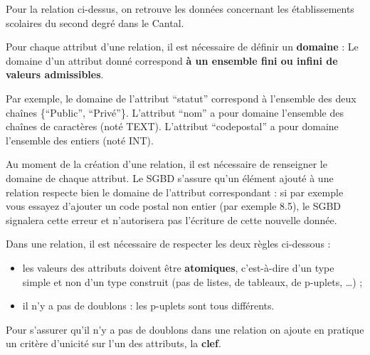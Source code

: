 \documentclass[
  letterpaper,
  DIV=11,
  numbers=noendperiod]{scrartcl}
\providecommand{\tightlist}{%
  \setlength{\itemsep}{0pt}\setlength{\parskip}{0pt}}\usepackage{longtable,booktabs,array}
\begin{document}
Pour la relation ci-dessus, on retrouve les données concernant les
établissements scolaires du second degré dans le Cantal.

Pour chaque attribut d'une relation, il est nécessaire de définir un
\textbf{domaine} : Le domaine d'un attribut donné correspond \textbf{à
un ensemble fini ou infini de valeurs admissibles}.

Par exemple, le domaine de l'attribut ``statut'' correspond à l'ensemble
des deux chaînes \{``Public'', ``Privé''\}. L'attribut ``nom'' a pour
domaine l'ensemble des chaînes de caractères (noté TEXT). L'attribut
``codepostal'' a pour domaine l'ensemble des entiers (noté INT).

Au moment de la création d'une relation, il est nécessaire de renseigner
le domaine de chaque attribut. Le SGBD s'assure qu'un élément ajouté à
une relation respecte bien le domaine de l'attribut correspondant : si
par exemple vous essayez d'ajouter un code postal non entier (par
exemple 8.5), le SGBD signalera cette erreur et n'autorisera pas
l'écriture de cette nouvelle donnée.

\begin{tcolorbox}[enhanced jigsaw, colbacktitle=quarto-callout-important-color!10!white, opacitybacktitle=0.6, left=2mm, coltitle=black, bottomtitle=1mm, arc=.35mm, opacityback=0, title=\textcolor{quarto-callout-important-color}{\faExclamation}\hspace{0.5em}{Règles à respecter}, breakable, toprule=.15mm, rightrule=.15mm, bottomrule=.15mm, colback=white, colframe=quarto-callout-important-color-frame, toptitle=1mm, titlerule=0mm, leftrule=.75mm]

Dans une relation, il est nécessaire de respecter les deux règles
ci-dessous :

\begin{itemize}
\tightlist
\item
  les valeurs des attributs doivent être \textbf{atomiques},
  c'est-à-dire d'un type simple et non d'un type construit (pas de
  listes, de tableaux, de p-uplets, \ldots) ;
\item
  il n'y a pas de doublons : les p-uplets sont tous différents.
\end{itemize}

\end{tcolorbox}

Pour s'assurer qu'il n'y a pas de doublons dans une relation on ajoute
en pratique un critère d'unicité sur l'un des attributs, la
\textbf{clef}.
\end{document}
